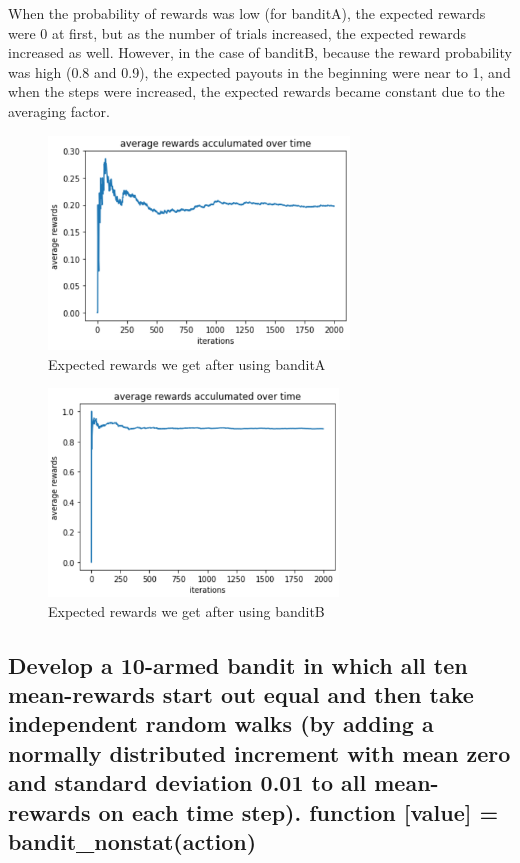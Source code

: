 \documentclass[15pt,journal]{IEEEtran}
\begin{document}
When the probability of rewards was low (for banditA), the expected rewards were 0 at first, but as the number of trials increased, the expected rewards increased as well. However, in the case of banditB, because the reward probability was high (0.8 and 0.9), the expected payouts in the beginning were near to 1, and when the steps were increased, the expected rewards became constant due to the averaging factor.


\begin{figure}[H]%
\begin {center}
\includegraphics[width=8cm]{images/lab9_1.PNG}
\caption{Expected rewards we get after using banditA} 
\label{fig:ecg}
\end {center}
\end{figure}






\begin{figure}[H]%
\begin {center}
\includegraphics[width=7.7cm]{images/lab9_2.PNG}
\caption{Expected rewards we get after using banditB} 
\label{fig:ecg}
\end {center}
\end{figure}


\subsection{Develop a 10-armed bandit in which all ten mean-rewards start out equal and then take independent random walks (by adding a normally distributed increment with mean zero and standard deviation 0.01 to all mean-rewards on each time step). 
    {function [value] = bandit_nonstat(action)}}
\end{document}
